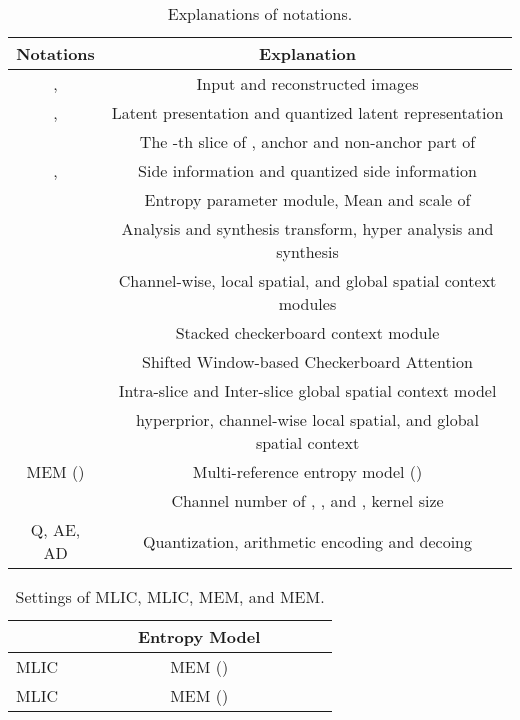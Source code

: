 \documentclass[sigconf]{acmart}
\begin{document}
\begin{table}
  \footnotesize
  \centering
  \begin{tabular}{c|c}
  \toprule
  Notations                                         & Explanation   \\ \midrule
  ,           & Input and reconstructed images              \\\midrule
  ,           & Latent presentation and quantized latent representation               \\\midrule
     & The -th slice of , anchor and non-anchor part of              \\\midrule
  ,           & Side information and quantized side information               \\\midrule
                                & Entropy parameter module, Mean and scale of            \\\midrule
                                & Analysis and synthesis transform, hyper analysis and synthesis          \\\midrule
                            & Channel-wise, local spatial, and global spatial context modules           \\\midrule
                                        & Stacked checkerboard context module     \\\midrule
                                       & Shifted Window-based Checkerboard Attention    \\\midrule
                        & Intra-slice and Inter-slice global spatial context model     \\\midrule
   & hyperprior, channel-wise local spatial, and global spatial context   \\\midrule
  MEM ()                                        & Multi-reference entropy model ()             \\\midrule
                                        & Channel number of , , and , kernel size            \\\midrule
  Q, AE, AD                                         & Quantization, arithmetic encoding and decoing            \\\midrule
  \end{tabular}
  \caption{Explanations of notations.}
  \label{tab:notation}
\end{table}
\begin{table}
  \footnotesize
  \centering
  \begin{tabular}{lccccccccc}
    \toprule
                &     &     &      &     & Entropy Model       \\ \midrule
      MLIC     &   &   &  &    &   MEM ()     \\\midrule
      MLIC &   &   &  &    &   MEM ()     \\\midrule
  \end{tabular}
  \caption{Settings of MLIC, MLIC, MEM, and MEM.}
  \label{tab:settings}
\end{table}
\end{document}
